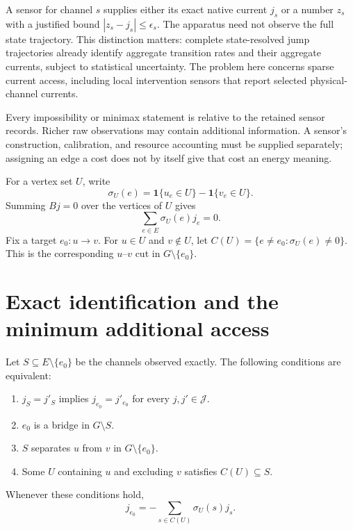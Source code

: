 A sensor for channel $s$ supplies either its exact native current $j_s$ or a
number $z_s$ with a justified bound $|z_s-j_s|\leq\epsilon_s$. The apparatus
need not observe the full state trajectory. This distinction matters: complete
state-resolved jump trajectories already identify aggregate transition rates
and their aggregate currents, subject to statistical uncertainty. The problem
here concerns sparse current access, including local intervention sensors that
report selected physical-channel currents.

Every impossibility or minimax statement is relative to the retained sensor
records. Richer raw observations may contain additional information. A sensor's
construction, calibration, and resource accounting must be supplied separately;
assigning an edge a cost does not by itself give that cost an energy meaning.

For a vertex set $U$, write
\begin{equation}
 \sigma_U(e)=\mathbf 1\{u_e\in U\}-\mathbf 1\{v_e\in U\}.
\end{equation}
Summing $Bj=0$ over the vertices of $U$ gives
\begin{equation}
 \sum_{e\in E}\sigma_U(e)j_e=0.
 \label{eq:graph-cut-conservation}
\end{equation}
Fix a target $e_0:u\to v$. For $u\in U$ and $v\notin U$, let
$C(U)=\{e\ne e_0:\sigma_U(e)\ne0\}$. This is the corresponding $u$--$v$
cut in $G\setminus\{e_0\}$.

\section{Exact identification and the minimum additional access}

\begin{theorem}
\label{thm:graph-target-identification}
Let $S\subseteq E\setminus\{e_0\}$ be the channels observed exactly. The
following conditions are equivalent:
\begin{enumerate}
 \item $j_S=j'_S$ implies $j_{e_0}=j'_{e_0}$ for every $j,j'\in\mathcal J$.
 \item $e_0$ is a bridge in $G\setminus S$.
 \item $S$ separates $u$ from $v$ in $G\setminus\{e_0\}$.
 \item Some $U$ containing $u$ and excluding $v$ satisfies $C(U)\subseteq S$.
\end{enumerate}
Whenever these conditions hold,
\begin{equation}
 j_{e_0}=-\sum_{s\in C(U)}\sigma_U(s)j_s.
 \label{eq:graph-target-estimator}
\end{equation}
\end{theorem}

